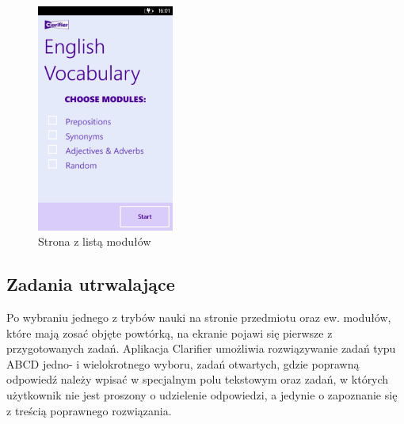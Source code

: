 \documentclass{pracamgr}
\begin{document}
\begin{figure}[h]
    \centering
    \includegraphics[width=0.4\textwidth]{Modules.png}
    \caption{Strona z listą modułów}
    \label{fig:modules}
\end{figure}

\subsection{Zadania utrwalające}
Po wybraniu jednego z trybów nauki na stronie przedmiotu oraz ew. modułów, które mają zosać objęte powtórką, na ekranie pojawi się pierwsze z przygotowanych zadań. Aplikacja Clarifier umożliwia rozwiązywanie zadań typu ABCD jedno- i wielokrotnego wyboru, zadań otwartych, gdzie poprawną odpowiedź należy wpisać w specjalnym polu tekstowym oraz zadań, w których użytkownik nie jest proszony o udzielenie odpowiedzi, a jedynie o zapoznanie się z treścią poprawnego rozwiązania. 
\end{document}
